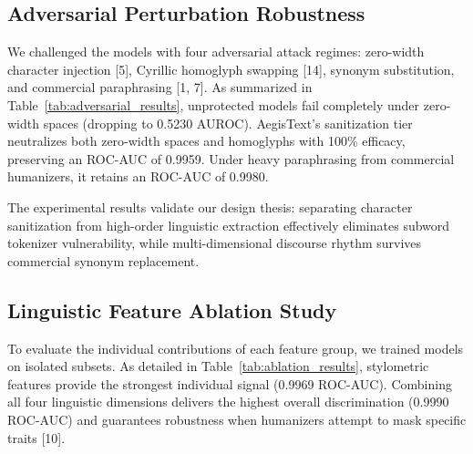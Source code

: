 \documentclass[conference]{IEEEtran}
\begin{document}
\subsection{Adversarial Perturbation Robustness}
We challenged the models with four adversarial attack regimes: zero-width character injection [5], Cyrillic homoglyph swapping [14], synonym substitution, and commercial paraphrasing [1, 7]. As summarized in Table~\ref{tab:adversarial_results}, unprotected models fail completely under zero-width spaces (dropping to 0.5230 AUROC). AegisText's sanitization tier neutralizes both zero-width spaces and homoglyphs with 100\% efficacy, preserving an ROC-AUC of 0.9959. Under heavy paraphrasing from commercial humanizers, it retains an ROC-AUC of 0.9980.

\begin{table}[htbp]
\caption{Adversarial Attack Resilience Evaluation}
\begin{center}
\label{tab:adversarial_results}
\end{center}
\end{table}

The experimental results validate our design thesis: separating character sanitization from high-order linguistic extraction effectively eliminates subword tokenizer vulnerability, while multi-dimensional discourse rhythm survives commercial synonym replacement.

\subsection{Linguistic Feature Ablation Study}
To evaluate the individual contributions of each feature group, we trained models on isolated subsets. As detailed in Table~\ref{tab:ablation_results}, stylometric features provide the strongest individual signal (0.9969 ROC-AUC). Combining all four linguistic dimensions delivers the highest overall discrimination (0.9990 ROC-AUC) and guarantees robustness when humanizers attempt to mask specific traits [10].
\end{document}
